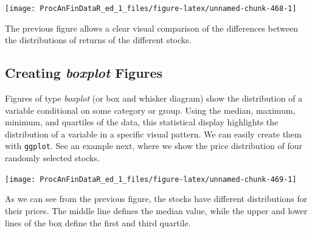 \documentclass[11pt,]{book}
\newenvironment{Shaded}{\begin{snugshade}}{\end{snugshade}}
\newcommand{\KeywordTok}[1]{\textcolor[rgb]{0.27,0.27,0.27}{\textbf{#1}}}
\newcommand{\DataTypeTok}[1]{\textcolor[rgb]{0.27,0.27,0.27}{#1}}
\newcommand{\DecValTok}[1]{\textcolor[rgb]{0.06,0.06,0.06}{#1}}
\newcommand{\StringTok}[1]{\textcolor[rgb]{0.5,0.5,0.5}{#1}}
\newcommand{\CommentTok}[1]{\textcolor[rgb]{0.56,0.35,0.01}{\textit{#1}}}
\newcommand{\OperatorTok}[1]{\textcolor[rgb]{0.81,0.36,0.00}{\textbf{#1}}}
\newcommand{\NormalTok}[1]{#1}
\begin{document}
\begin{center}\texttt{[image: ProcAnFinDataR\_ed\_1\_files/figure-latex/unnamed-chunk-468-1]} \end{center}

The previous figure allows a clear visual comparison of the differences
between the distributions of returns of the different stocks.

\subsection{\texorpdfstring{Creating \emph{boxplot}
Figures}{Creating boxplot Figures}}\label{creating-boxplot-figures}

Figures of type \emph{boxplot} (or box and whisker diagram) show the
distribution of a variable conditional on some category or group. Using
the median, maximum, minimum, and quartiles of the data, this
statistical display highlights the distribution of a variable in a
specific visual pattern. We can easily create them with \texttt{ggplot}.
See an example next, where we show the price distribution of four
randomly selected stocks.

\begin{Shaded}
\end{Shaded}

\begin{center}\texttt{[image: ProcAnFinDataR\_ed\_1\_files/figure-latex/unnamed-chunk-469-1]} \end{center}

As we can see from the previous figure, the stocks have different
distributions for their prices. The middle line defines the median
value, while the upper and lower lines of the box define the first and
third quartile.
\end{document}
